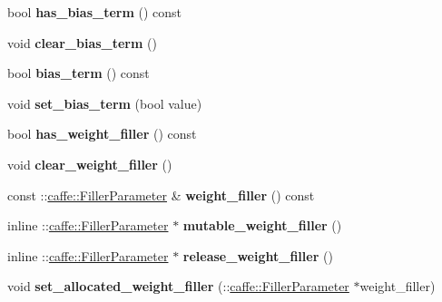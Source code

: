 \begin{DoxyCompactItemize}
bool {\bfseries has\+\_\+bias\+\_\+term} () const
\item 
\mbox{\label{classcaffe_1_1_embed_parameter_ab30cd8af95969a5dc8f99fc58aacce3b}} 
void {\bfseries clear\+\_\+bias\+\_\+term} ()
\item 
\mbox{\label{classcaffe_1_1_embed_parameter_a3697b3cdd922019a61b2c89dc1593bf0}} 
bool {\bfseries bias\+\_\+term} () const
\item 
\mbox{\label{classcaffe_1_1_embed_parameter_a643c2dc38fb596f08f0ccfa154b4939f}} 
void {\bfseries set\+\_\+bias\+\_\+term} (bool value)
\item 
\mbox{\label{classcaffe_1_1_embed_parameter_a78061b2d0175049837a223d339517e35}} 
bool {\bfseries has\+\_\+weight\+\_\+filler} () const
\item 
\mbox{\label{classcaffe_1_1_embed_parameter_a4867f9d6414dc6591f01cc6da99606ac}} 
void {\bfseries clear\+\_\+weight\+\_\+filler} ()
\item 
\mbox{\label{classcaffe_1_1_embed_parameter_a9b70d248314178377cd48252fa7d2ef6}} 
const \+::\mbox{\hyperlink{classcaffe_1_1_filler_parameter}{caffe\+::\+Filler\+Parameter}} \& {\bfseries weight\+\_\+filler} () const
\item 
\mbox{\label{classcaffe_1_1_embed_parameter_a12b48e8b8f272a5abd58a482ad280476}} 
inline \+::\mbox{\hyperlink{classcaffe_1_1_filler_parameter}{caffe\+::\+Filler\+Parameter}} $\ast$ {\bfseries mutable\+\_\+weight\+\_\+filler} ()
\item 
\mbox{\label{classcaffe_1_1_embed_parameter_a7d5524ccb8dc43fda6772224b8174cb9}} 
inline \+::\mbox{\hyperlink{classcaffe_1_1_filler_parameter}{caffe\+::\+Filler\+Parameter}} $\ast$ {\bfseries release\+\_\+weight\+\_\+filler} ()
\item 
\mbox{\label{classcaffe_1_1_embed_parameter_a46585da844ea685e5233e383d33e898d}} 
void {\bfseries set\+\_\+allocated\+\_\+weight\+\_\+filler} (\+::\mbox{\hyperlink{classcaffe_1_1_filler_parameter}{caffe\+::\+Filler\+Parameter}} $\ast$weight\+\_\+filler)

\end{DoxyCompactItemize}
